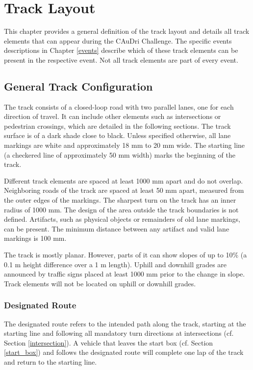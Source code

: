 \chapter{Track Layout}
\label{track_layout}

This chapter provides a general definition of the track layout and details all track elements that can appear during the CAuDri Challenge.
The specific events descriptions in Chapter \ref{events} describe which of these track elements can be present in the respective event.
Not all track elements are part of every event.

\section{General Track Configuration}
\label{general_track_configuration}

The track consists of a closed-loop road with two parallel lanes, one for each direction of travel.
It can include other elements such as intersections or pedestrian crossings, which are detailed in the following sections.
The track surface is of a dark shade close to black.
Unless specified otherwise, all lane markings are white and approximately 18 mm to 20 mm wide.
The starting line (a checkered line of approximately 50 mm width) marks the beginning of the track.

Different track elements are spaced at least 1000 mm apart and do not overlap.
Neighboring roads of the track are spaced at least 50 mm apart, measured from the outer edges of the markings.
The sharpest turn on the track has an inner radius of 1000 mm.
The design of the area outside the track boundaries is not defined.
Artifacts, such as physical objects or remainders of old lane markings, can be present. The minimum distance between any artifact and valid lane markings is 100 mm.

The track is mostly planar.
However, parts of it can show slopes of up to 10\% (a 0.1 m height difference over a 1 m length).
Uphill and downhill grades are announced by traffic signs placed at least 1000 mm prior to the change in slope.
Track elements will not be located on uphill or downhill grades.

\subsection{Designated Route}
\label{designated_route}

The designated route refers to the intended path along the track, starting at the starting line and following all mandatory turn directions at intersections (cf. Section \ref{intersection}).
A vehicle that leaves the start box (cf. Section \ref{start_box}) and follows the designated route will complete one lap of the track and return to the starting line.

